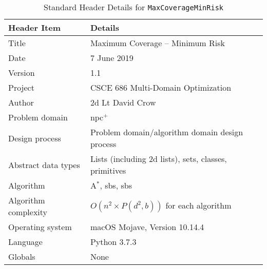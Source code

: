 \documentclass[../main.tex]{subfiles}
\begin{document}
\begin{table}[h!]
\centering
\caption{Standard Header Details for \texttt{MaxCoverageMinRisk}}
\label{tab:header}
\begin{tabular}{|l|l|}
\hline
\textbf{Header Item}     & \textbf{Details}                                                                                           \\
\hline
    Title                & Maximum Coverage -- Minimum Risk                                                                           \\
    Date                 & 7 June 2019                                                                                                \\
    Version              & 1.1                                                                                                        \\
    Project              & CSCE 686 Multi-Domain Optimization                                                                         \\
    Author               & 2d Lt David Crow                                                                                           \\
    Problem domain       & \ac{npc}$^+$                                                                                               \\
    Design process       & Problem domain/algorithm domain design process                                                             \\
    Abstract data types  & Lists (including \ac{2d} lists), sets, classes, primitives                                                 \\
    Algorithm            & A$^*$, \acl{sbs}, \acl{sbs}                                                                                \\
    Algorithm complexity & $O(n^2\times P(d^2,b))$ for each algorithm                                                                 \\
    Operating system     & macOS Mojave, Version 10.14.4                                                                              \\
    Language             & Python 3.7.3                                                                                               \\
    Globals              & None                                                                                                       \\

\end{tabular}
\end{table}
\end{document}
